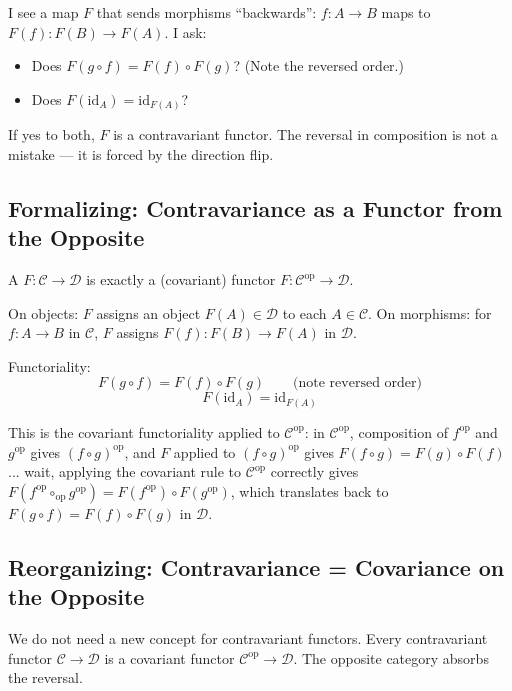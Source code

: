 \begin{dialog}
I see a map $F$ that sends morphisms ``backwards'': $f : A \to B$ maps to
$F(f) : F(B) \to F(A)$. I ask:

\begin{itemize}
  \item Does $F(g \circ f) = F(f) \circ F(g)$? (Note the reversed order.)
  \item Does $F(\mathrm{id}_A) = \mathrm{id}_{F(A)}$?
\end{itemize}

If yes to both, $F$ is a contravariant functor. The reversal in composition
is not a mistake --- it is forced by the direction flip.
\end{dialog}

\subsection{Formalizing: Contravariance as a Functor from the Opposite}

A  $F : \mathcal{C} \to \mathcal{D}$ is exactly
a (covariant) functor $F : \mathcal{C}^{\mathrm{op}} \to \mathcal{D}$.

On objects: $F$ assigns an object $F(A) \in \mathcal{D}$ to each $A \in
\mathcal{C}$. On morphisms: for $f : A \to B$ in $\mathcal{C}$, $F$ assigns
$F(f) : F(B) \to F(A)$ in $\mathcal{D}$.

Functoriality:
\[
  F(g \circ f) = F(f) \circ F(g) \qquad\text{(note reversed order)}
\]
\[
  F(\mathrm{id}_A) = \mathrm{id}_{F(A)}
\]

This is the covariant functoriality applied to $\mathcal{C}^{\mathrm{op}}$:
in $\mathcal{C}^{\mathrm{op}}$, composition of $f^{\mathrm{op}}$ and
$g^{\mathrm{op}}$ gives $(f \circ g)^{\mathrm{op}}$, and $F$ applied to
$(f \circ g)^{\mathrm{op}}$ gives $F(f \circ g) = F(g) \circ F(f)$... wait,
applying the covariant rule to $\mathcal{C}^{\mathrm{op}}$ correctly gives
$F(f^{\mathrm{op}} \circ_{\mathrm{op}} g^{\mathrm{op}}) = F(f^{\mathrm{op}})
\circ F(g^{\mathrm{op}})$, which translates back to $F(g \circ f) =
F(f) \circ F(g)$ in $\mathcal{D}$.

\subsection{Reorganizing: Contravariance = Covariance on the Opposite}

We do not need a new concept for contravariant functors. Every contravariant
functor $\mathcal{C} \to \mathcal{D}$ is a covariant functor
$\mathcal{C}^{\mathrm{op}} \to \mathcal{D}$. The opposite category absorbs
the reversal.

